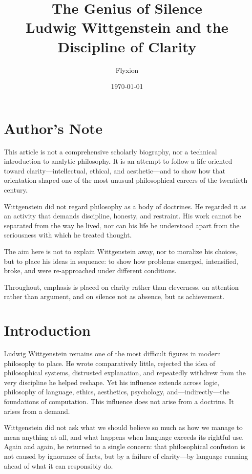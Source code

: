 \documentclass[11pt]{article}
\title{\textbf{The Genius of Silence}\\
\large Ludwig Wittgenstein and the Discipline of Clarity}
\author{Flyxion}
\date{\today}
\begin{document}
\maketitle

\section*{Author’s Note}

This article is not a comprehensive scholarly biography, nor a technical introduction to analytic philosophy. It is an attempt to follow a life oriented toward clarity—intellectual, ethical, and aesthetic—and to show how that orientation shaped one of the most unusual philosophical careers of the twentieth century.

Wittgenstein did not regard philosophy as a body of doctrines. He regarded it as an activity that demands discipline, honesty, and restraint. His work cannot be separated from the way he lived, nor can his life be understood apart from the seriousness with which he treated thought.

The aim here is not to explain Wittgenstein away, nor to moralize his choices, but to place his ideas in sequence: to show how problems emerged, intensified, broke, and were re-approached under different conditions.

Throughout, emphasis is placed on clarity rather than cleverness, on attention rather than argument, and on silence not as absence, but as achievement.

\newpage
\section*{Introduction}

Ludwig Wittgenstein remains one of the most difficult figures in modern philosophy to place. He wrote comparatively little, rejected the idea of philosophical systems, distrusted explanation, and repeatedly withdrew from the very discipline he helped reshape. Yet his influence extends across logic, philosophy of language, ethics, aesthetics, psychology, and—indirectly—the foundations of computation. This influence does not arise from a doctrine. It arises from a demand.

Wittgenstein did not ask what we should believe so much as how we manage to mean anything at all, and what happens when language exceeds its rightful use. Again and again, he returned to a single concern: that philosophical confusion is not caused by ignorance of facts, but by a failure of clarity—by language running ahead of what it can responsibly do.
\end{document}
